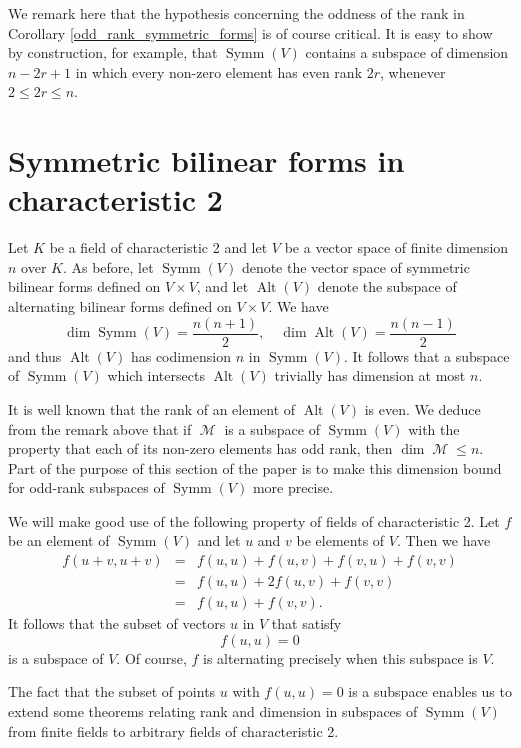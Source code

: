 \documentclass{amsart}
\DeclareMathOperator{\Alt}{Alt}
\DeclareMathOperator{\M}{\mathcal{M}}
\DeclareMathOperator{\Symm}{Symm}
\theoremstyle{plain}
\theoremstyle{definition}
\begin{document}
We remark here that the hypothesis concerning the oddness of the rank in Corollary \ref{odd_rank_symmetric_forms} is of course critical.
It is easy to show by construction, for example, that $\Symm(V)$ contains a subspace of dimension $n-2r+1$ in which every non-zero element has 
even rank $2r$,
whenever $2\leq 2r\leq n$.





\section{Symmetric bilinear forms in characteristic 2}


\noindent Let $K$ be a field of characteristic 2 and let $V$ be a vector space of finite dimension $n$ over $K$. 
As before, let $\Symm(V)$ denote the 
vector space of symmetric bilinear forms defined on $V\times V$, and let $\Alt(V)$ denote the subspace of alternating bilinear forms
defined on $V\times V$. We have
\[
 \dim \Symm(V)=\frac{n(n+1)}{2},\quad \dim \Alt(V)=\frac{n(n-1)}{2}
\]
and thus $\Alt(V)$ has codimension $n$ in $\Symm(V)$. It follows that a subspace of $\Symm(V)$ which intersects $\Alt(V)$ trivially has
dimension at most $n$. 

It is well known that the rank of an element of $\Alt(V)$ is even. We deduce from the remark above that if $\M$ is a subspace of $\Symm(V)$
with the property that each of its non-zero elements has odd rank, then $\dim \M\leq n$. Part of the purpose of this section of the paper is to make this
dimension bound for odd-rank subspaces of $\Symm(V)$ more precise. 

We will make good use of the following property of fields of characteristic 2.
Let $f$ be an element of $\Symm(V)$ and let $u$ and $v$ be elements of $V$. Then we have
\begin{eqnarray*}
 f(u+v,u+v)&=&f(u,u)+f(u,v)+f(v,u)+f(v,v)\\
&=&f(u,u)+2f(u,v)+f(v,v)\\
&=&f(u,u)+f(v,v).
\end{eqnarray*}
It follows that the subset of vectors $u$ in $V$ that satisfy
\[
 f(u,u)=0
\]
is a subspace of $V$. Of course, $f$ is alternating precisely when this
subspace is $V$. 

The fact that the subset of points $u$ with $f(u,u)=0$ is a subspace enables us to extend some theorems relating rank and dimension in subspaces
of $\Symm(V)$ from finite fields to arbitrary fields of characteristic 2. 
\end{document}
